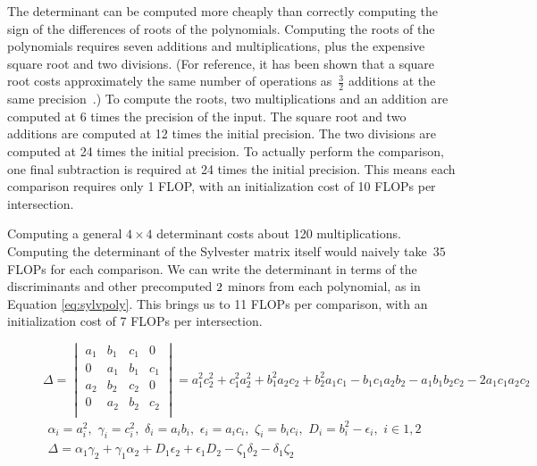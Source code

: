 \documentclass{cccg16}
\begin{document}
The determinant can be computed more cheaply than correctly computing
the sign of the differences of roots of the polynomials.  Computing
the roots of the polynomials requires seven additions and
multiplications, plus the expensive square root and two divisions.
(For reference, it has been shown that a square root costs
approximately the same number of operations as~$\frac{3}{2}$ additions
at the same precision~\cite{karatsuba}.)  To compute the roots, two
multiplications and an addition are computed at 6 times the precision
of the input.  The square root and two additions are computed at 12
times the initial precision.  The two divisions are computed at 24
times the initial precision.  To actually perform the comparison, one
final subtraction is required at 24 times the initial precision. This
means each comparison requires only 1 FLOP, with an initialization
cost of 10 FLOPs per intersection.

Computing a general $4\times 4$ determinant costs about 120
multiplications.  Computing the determinant of the Sylvester matrix
itself would naively take~$35$ FLOPs for each comparison.  We can
write the determinant in terms of the discriminants and other
precomputed $2\time 2$ minors from each polynomial, as in Equation
\ref{eq:sylvpoly}.  This brings us to 11 FLOPs per comparison, with an
initialization cost of 7 FLOPs per intersection.

\begin{figure}
  \begin{equation*}
    \Delta=\begin{vmatrix}
    a_1 & b_1 & c_1 & 0\\
    0 & a_1 & b_1 & c_1\\
    a_2 & b_2 & c_2 & 0\\
    0 & a_2 & b_2 & c_2\\
    \end{vmatrix}=
    a_1^2 c_2^2 + c_1^2 a_2^2 + b_1^2 a_2 c_2 + b_2^2 a_1 c_1 -
    b_1 c_1 a_2 b_2 - a_1 b_1 b_2 c_2 - 2 a_1 c_1 a_2 c_2
  \end{equation*}
  \begin{align}
    \alpha_i=a_i^2,\,\, \gamma_i=c_i^2,\,\,
    \delta_i=a_i b_i,\,\, \epsilon_i=a_i c_i,\,\, \zeta_i=b_i c_i,\,\,
    D_i=b_i^2-\epsilon_i,\,\,
    i\in {1, 2}\\
    \Delta = \alpha_1 \gamma_2 + \gamma_1 \alpha_2 +
    D_1 \epsilon_2 + \epsilon_1 D_2 - \zeta_1 \delta_2 -
    \delta_1 \zeta_2
  \label{eq:sylvpoly}
  \end{align}
\end{figure}
\end{document}
